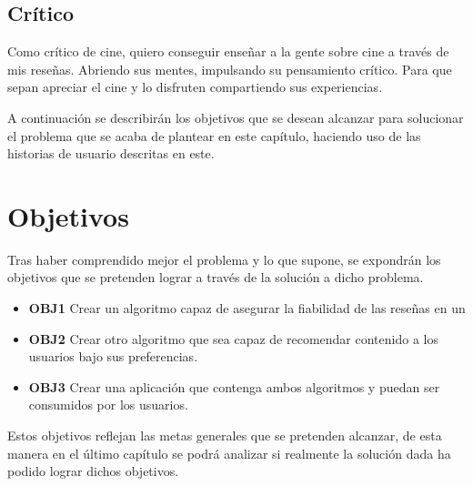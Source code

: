 \subsection{Crítico}

Como crítico de cine, quiero conseguir enseñar a la gente sobre cine a través de mis reseñas. Abriendo sus mentes, impulsando su pensamiento crítico. Para que sepan apreciar el cine y lo disfruten compartiendo sus experiencias.

A continuación se describirán los objetivos que se desean alcanzar para solucionar el problema que se 
acaba de plantear en este capítulo, haciendo uso de las historias de usuario descritas en este.

\section{Objetivos}

Tras haber comprendido mejor el problema y lo que supone, se expondrán los objetivos que se pretenden 
lograr a través de la solución a dicho problema.

\begin{itemize}
    \item \textbf{OBJ1} Crear un algoritmo capaz de asegurar la fiabilidad de las reseñas en un %
    \item \textbf{OBJ2} Crear otro algoritmo que sea capaz de recomendar contenido a los usuarios bajo sus preferencias.
    \item \textbf{OBJ3} Crear una aplicación que contenga ambos algoritmos y puedan ser consumidos por los usuarios.
\end{itemize}

Estos objetivos reflejan las metas generales que se pretenden alcanzar, de esta manera en el último 
capítulo se podrá analizar si realmente la solución dada ha podido lograr dichos objetivos.